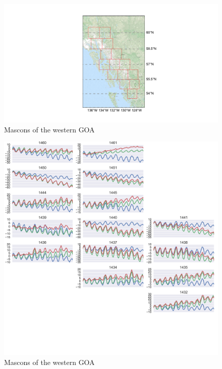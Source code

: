 \documentclass[review,oneside]{igs}
\begin{document}
\begin{figure}
\noindent\includegraphics[width=178mm]{figures/southeasternMap} \centering \caption{Mascons of the western GOA} \label{fig:summer}
\end{figure}

\begin{figure}
\noindent\includegraphics[width=178mm]{figures/southeasternPlot} \centering \caption{Mascons of the western GOA} \label{fig:summer}
\end{figure}

\end{document}
